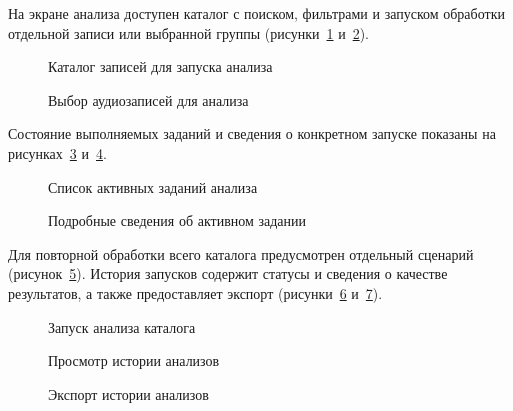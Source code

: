 На экране анализа доступен каталог с поиском, фильтрами и запуском обработки
отдельной записи или выбранной группы (рисунки~\ref{fig:proto1} и~\ref{fig:proto2}).
\begin{figure}[H]\centering
 \caption{Каталог записей для запуска анализа}\label{fig:proto1}
\end{figure}
\begin{figure}[H]\centering
 \caption{Выбор аудиозаписей для анализа}\label{fig:proto2}
\end{figure}

Состояние выполняемых заданий и сведения о конкретном запуске показаны
на рисунках~\ref{fig:proto3} и~\ref{fig:proto4}.
\begin{figure}[H]\centering
 \caption{Список активных заданий анализа}\label{fig:proto3}
\end{figure}
\begin{figure}[H]\centering
 \caption{Подробные сведения об активном задании}\label{fig:proto4}
\end{figure}

Для повторной обработки всего каталога предусмотрен отдельный сценарий
(рисунок~\ref{fig:proto5}). История запусков содержит статусы и сведения
о качестве результатов, а также предоставляет экспорт (рисунки~\ref{fig:proto6}
и~\ref{fig:proto7}).
\begin{figure}[H]\centering
 \caption{Запуск анализа каталога}\label{fig:proto5}
\end{figure}
\begin{figure}[H]\centering
 \caption{Просмотр истории анализов}\label{fig:proto6}
\end{figure}
\begin{figure}[H]\centering
 \caption{Экспорт истории анализов}\label{fig:proto7}
\end{figure}


